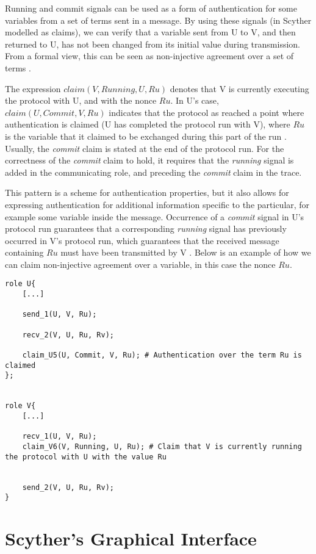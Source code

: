 Running and commit signals can be used as a form of authentication for some variables from a set of terms sent in a message. By using these signals (in Scyther modelled as claims), we can verify that a variable sent from U to V, and then returned to U, has not been changed from its initial value during transmission. From a formal view, this can be seen as non-injective agreement over a set of terms \cite{scyther-manual}.

The expression $claim(V, Running, U, Ru)$ denotes that V is currently executing the protocol with U, and with the nonce $Ru$. In U's case, $claim(U, Commit, V, Ru)$ indicates that the protocol as reached a point where authentication is claimed (U has completed the protocol run with V), where $Ru$ is the variable that it claimed to be exchanged during this part of the run \cite{ryan2001modelling}. Usually, the \emph{commit} claim is stated at the end of the protocol run. For the correctness of the \emph{commit} claim to hold, it requires that the \emph{running} signal is added in the communicating role, and preceding the \emph{commit} claim in the trace.

This pattern is a scheme for authentication properties, but it also allows for expressing authentication for additional information specific to the particular, for example some variable inside the message. Occurrence of a \emph{commit} signal in U's protocol run guarantees that a corresponding \emph{running} signal has previously occurred in V's protocol run, which guarantees that the received message containing $Ru$ must have been transmitted by V \cite{ryan2001modelling}. Below is an example of how we can claim non-injective agreement over a variable, in this case the nonce $Ru$. 
\newline

\begin{lstlisting}
role U{
	[...]
	
	send_1(U, V, Ru);
	
	recv_2(V, U, Ru, Rv);
	
	claim_U5(U, Commit, V, Ru); # Authentication over the term Ru is claimed
};


role V{
	[...]
	
	recv_1(U, V, Ru);
	claim_V6(V, Running, U, Ru); # Claim that V is currently running the protocol with U with the value Ru
	
	
	send_2(V, U, Ru, Rv); 
}
\end{lstlisting}

\section{Scyther's Graphical Interface}


